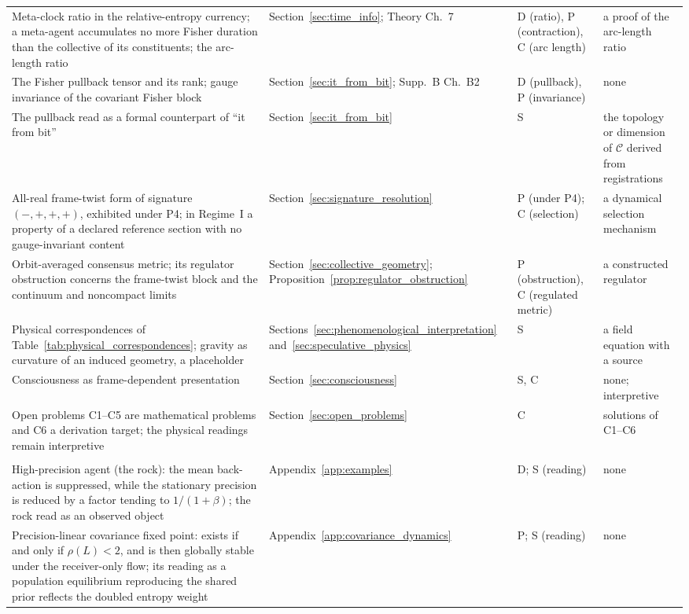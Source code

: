 \documentclass[11pt]{article}
\begin{document}
{\begin{longtable}{@{}>{\raggedright\arraybackslash}p{}>{\raggedright\arraybackslash}p{}>{\raggedright\arraybackslash}p{}>{\raggedright\arraybackslash}p{}@{}}
Meta-clock ratio in the relative-entropy currency; a meta-agent accumulates no more Fisher duration than the collective of its constituents; the arc-length ratio & Section~\ref{sec:time_info}; Theory Ch.~7 & D (ratio), P (contraction), C (arc length) & a proof of the arc-length ratio \\
The Fisher pullback tensor and its rank; gauge invariance of the covariant Fisher block & Section~\ref{sec:it_from_bit}; Supp.~B Ch.~B2 & D (pullback), P (invariance) & none \\
The pullback read as a formal counterpart of ``it from bit'' & Section~\ref{sec:it_from_bit} & S & the topology or dimension of $\mathcal{C}$ derived from registrations \\
All-real frame-twist form of signature $(-,+,+,+)$, exhibited under P4; in Regime~I a property of a declared reference section with no gauge-invariant content & Section~\ref{sec:signature_resolution} & P (under P4); C (selection) & a dynamical selection mechanism \\
Orbit-averaged consensus metric; its regulator obstruction concerns the frame-twist block and the continuum and noncompact limits & Section~\ref{sec:collective_geometry}; Proposition~\ref{prop:regulator_obstruction} & P (obstruction), C (regulated metric) & a constructed regulator \\
Physical correspondences of Table~\ref{tab:physical_correspondences}; gravity as curvature of an induced geometry, a placeholder & Sections~\ref{sec:phenomenological_interpretation} and~\ref{sec:speculative_physics} & S & a field equation with a source \\
Consciousness as frame-dependent presentation & Section~\ref{sec:consciousness} & S, C & none; interpretive \\
Open problems C1--C5 are mathematical problems and C6 a derivation target; the physical readings remain interpretive & Section~\ref{sec:open_problems} & C & solutions of C1--C6 \\
\multicolumn{4}{@{}l}{\emph{Appendices}}\\
High-precision agent (the rock): the mean back-action is suppressed, while the stationary precision is reduced by a factor tending to $1/(1+\beta)$; the rock read as an observed object & Appendix~\ref{app:examples} & D; S (reading) & none \\
Precision-linear covariance fixed point: exists if and only if $\rho(L)<2$, and is then globally stable under the receiver-only flow; its reading as a population equilibrium reproducing the shared prior reflects the doubled entropy weight & Appendix~\ref{app:covariance_dynamics} & P; S (reading) & none \\

\end{longtable}}
\end{document}
